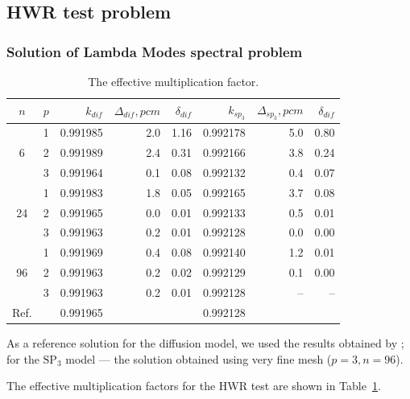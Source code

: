 \documentclass[a4paper]{jpconf}
\begin{document}
\subsection{HWR test problem}

\subsubsection{Solution of Lambda Modes spectral problem}
\begin{table}[h]
\caption{The effective multiplication factor.}
\label{tab:hwr_lambda}
\begin{center}
\begin{tabular}{c c r r r r r r}
\hline
$n$ & $p$ & $k_{dif}$ & $\Delta_{dif},pcm$ & $\delta_{dif}$ &$k_{sp_3}$& $\Delta_{sp_3},pcm$ & $\delta_{dif}$ \\
\hline
	& 1	& 0.991985&  2.0& 1.16&0.992178&   5.0& 0.80\\
6	& 2	& 0.991989&  2.4& 0.31&0.992166&   3.8& 0.24\\
	& 3	& 0.991964&  0.1& 0.08&0.992132&   0.4& 0.07\\
\hline
	& 1	& 0.991983&  1.8& 0.05&0.992165&   3.7& 0.08\\
24& 2	& 0.991965&  0.0& 0.01&0.992133&   0.5& 0.01\\
	& 3	& 0.991963&  0.2& 0.01&0.992128&   0.0& 0.00\\ 
\hline
	& 1	& 0.991969&  0.4& 0.08&0.992140&   1.2& 0.01\\
96& 2	& 0.991963&  0.2& 0.02&0.992129&   0.1& 0.00\\
	& 3	& 0.991963&  0.2& 0.01&0.992128&    --& --\\ 
\hline
Ref.&   & 0.991965&    & & 0.992128 & & \\ 
\hline
\end{tabular}
\end{center}
\end{table}

As a reference solution for the diffusion model, we used the  results obtained by \cite{chao1995}; for the $\mathrm{SP_3}$ model --- the solution obtained using very fine mesh ($p = 3, n = 96$).

The effective multiplication factors for the HWR test are shown in Table~\ref{tab:hwr_lambda}. 
\end{document}
